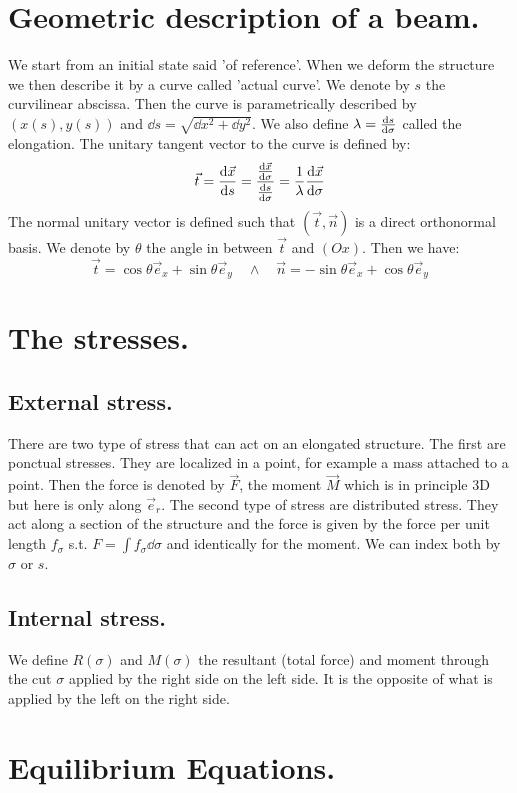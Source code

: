 \documentclass[10pt,a4paper]{book}
\begin{document}
\section{Geometric description of a beam.}
We start from an initial state said 'of reference'. When we deform the structure we then describe it by a curve called 'actual curve'. We denote by $s$ the curvilinear abscissa. Then the curve is parametrically described by $(x(s), y(s))$ and $\dd s = \sqrt{\dd x^2 + \dd y^2}$. We also define $\lambda = \dv{s}{\sigma}$ called the elongation. The unitary tangent vector to the curve is defined by:
\[
\vec{t} = \dv{\vec{x}}{s} = \frac{\dv{\vec{x}}{\sigma}}{\dv{s}{\sigma}} = \frac{1}{\lambda} \dv{\vec{x}}{\sigma}
\]
The normal unitary vector is defined such that $(\vec{t}, \vec{n})$ is a direct orthonormal basis. We denote by $\theta$ the angle in between $\vec{t}$ and $(Ox)$. Then we have:
\[
\vec{t} = \cos\theta \vec{e}_x + \sin \theta \vec{e}_y \quad \land \quad \vec{n} = -\sin \theta \vec{e}_x + \cos \theta \vec{e}_y 
\]

\section{The stresses.}
\subsection{External stress.}
There are two type of stress that can act on an elongated structure. The first are ponctual stresses. They are localized in a point, for example a mass attached to a point. Then the force is denoted by $\vec{F}$, the moment $\vec{M}$ which is in principle 3D but here is only along $\vec{e}_r$. The second type of stress are distributed stress. They act along a section of the structure and the force is given by the force per unit length $f_\sigma$ s.t. $F = \int f_\sigma \dd \sigma$ and identically for the moment. We can index both by $\sigma$ or $s$.

\subsection{Internal stress.}
We define $R(\sigma)$ and $M(\sigma)$ the resultant (total force) and moment through the cut $\sigma$ applied by the right side on the left side. It is the opposite of what is applied by the left on the right side.

\section{Equilibrium Equations.}
\end{document}
